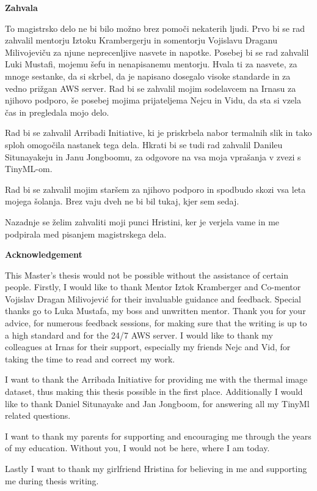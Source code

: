 \begin{poglavje}
\noindent\bfseries Zahvala
\end{poglavje}

To magistrsko delo ne bi bilo možno brez pomoči nekaterih ljudi.
Prvo bi se rad zahvalil mentorju Iztoku Krambergerju in somentorju Vojislavu Draganu Milivojeviču za njune neprecenljive nasvete in napotke.
Posebej bi se rad zahvalil Luki Mustafi, mojemu šefu in nenapisanemu mentorju.
Hvala ti za nasvete, za mnoge sestanke, da si skrbel, da je napisano dosegalo visoke standarde in za vedno prižgan AWS server.
Rad bi se zahvalil mojim sodelavcem na Irnasu za njihovo podporo, še posebej mojima prijateljema Nejcu in Vidu, da sta si vzela čas in pregledala mojo delo.

Rad bi se zahvalil Arribadi Initiative, ki je priskrbela nabor termalnih slik in tako sploh omogočila nastanek tega dela.
Hkrati bi se tudi rad zahvalil Danileu Situnayakeju in Janu Jongboomu, za odgovore na vsa moja vprašanja v zvezi s TinyML-om.

Rad bi se zahvalil mojim staršem za njihovo podporo in spodbudo skozi vsa leta mojega šolanja.
Brez vaju dveh ne bi bil tukaj, kjer sem sedaj.

Nazadnje se želim zahvaliti moji punci Hristini, ker je verjela vame in me podpirala med pisanjem magistrskega dela.
\clearpage

\begin{poglavje}
\noindent\bfseries Acknowledgement
\end{poglavje}

This Master's thesis would not be possible without the assistance of certain people.
Firstly, I would like to thank Mentor Iztok Kramberger and Co-mentor Vojislav Dragan Milivojević for their invaluable guidance and feedback.
Special thanks go to Luka Mustafa, my boss and unwritten mentor.
Thank you for your advice, for numerous feedback sessions, for making sure that the writing is up to a high standard and for the 24/7 AWS server.
I would like to thank my colleagues at Irnas for their support, especially my friends Nejc and Vid, for taking the time to read and correct my work.

I want to thank the Arribada Initiative for providing me with the thermal image dataset, thus making this thesis possible in the first place.
Additionally I would like to thank Daniel Situnayake and Jan Jongboom, for answering all my TinyMl related questions.

I want to thank my parents for supporting and encouraging me through the years of my education. 
Without you, I would not be here, where I am today.

Lastly I want to thank my girlfriend Hristina for believing in me and supporting me during thesis writing.
\newpage
